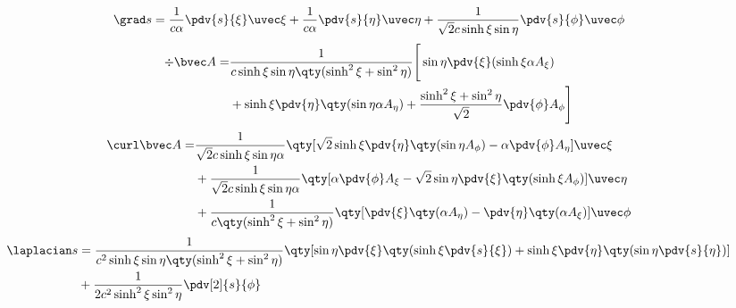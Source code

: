 \begin{equation}
\grad s = \frac{1}{c\alpha} \pdv{s}{\xi}\uvec \xi + \frac{1}{c\alpha}\pdv{s}{\eta} \uvec \eta +  \frac{1}{\sqrt{2}c\sinh\xi\sin\eta}\pdv{s}{\phi}\uvec \phi
\end{equation}
\begin{equation}
\begin{aligned}
\div \bvec A = &\frac{1}{c\sinh\xi\sin\eta\qty(\sinh^2\xi+\sin^2\eta)}\Bigg[\sin\eta\pdv{\xi}(\sinh\xi\alpha A_\xi) \\&+ \sinh\xi\pdv{\eta}\qty(\sin\eta\alpha A_\eta) + \frac{\sinh^2\xi+\sin^2\eta}{\sqrt{2}}\pdv{\phi}A_\phi\Bigg]
\end{aligned}
\end{equation}
\begin{equation}
\begin{aligned}
\curl \bvec A =& \frac{1}{\sqrt{2}c\sinh\xi\sin\eta\alpha}\qty[\sqrt{2}\sinh\xi\pdv{\eta}\qty(\sin\eta
A_\phi) - \alpha\pdv{\phi}A_\eta]\uvec \xi\\
&+ \frac{1}{\sqrt{2}c\sinh\xi\sin\eta\alpha}\qty[\alpha\pdv{\phi}A_\xi - \sqrt{2}\sin\eta\pdv{\xi}\qty(\sinh\xi
A_\phi)]\uvec \eta
\\
&+\frac{1}{c\qty(\sinh^2\xi+\sin^2\eta)}\qty[\pdv{\xi}\qty(\alpha A_\eta) - \pdv{\eta}\qty(\alpha A_\xi)]\uvec \phi
\end{aligned}
\end{equation}
\begin{equation}
\begin{aligned}
\laplacian s &= \frac{1}{c^2\sinh\xi\sin\eta\qty(\sinh^2\xi+\sin^2\eta)}\qty[\sin\eta\pdv{\xi}\qty(\sinh\xi\pdv{s}{\xi}) + \sinh\xi\pdv{\eta}\qty(\sin\eta\pdv{s}{\eta})]\\
& + \frac{1}{2c^2\sinh^2\xi\sin^2\eta }\pdv[2]{s}{\phi}
\end{aligned}
\end{equation}

